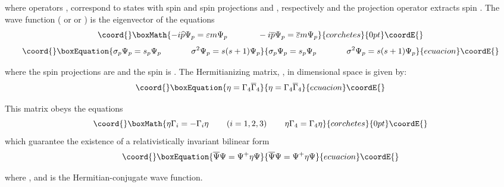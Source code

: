 \documentclass[a4paper,12pt]{article}
\begin{document}
where operators \coordHE{}, \coordHE{}
correspond to states with spin \coordHE{} and spin projections \coordHE{}
and \coordHE{}, respectively and the projection operator \coordHE{} extracts spin \coordHE{}.
The wave function \coordHE{} (\coordHE{} or \myHighlight{$\Psi _{\varepsilon
,\overline{\varepsilon }}$}\coordHE{} or \coordHE{}) is the eigenvector of the
equations
\[\coord{}\boxMath{
-i\widehat{p}\Psi _p=\varepsilon m\Psi
_p\hspace{0.5in}-i\overline{p}\Psi _p= \overline{\varepsilon
}m\Psi _p
}{corchetes}{0pt}\coordE{}\]
\begin{equation}\coord{}\boxEquation{
\sigma _p\Psi _p=s_p\Psi _p\hspace{0.5in}\sigma ^2\Psi _p=s(s+1)\Psi _p
\label{34}
}{
\sigma _p\Psi _p=s_p\Psi _p\hspace{0.5in}\sigma ^2\Psi _p=s(s+1)\Psi _p
}{ecuacion}\coordE{}\end{equation}

where the spin projections are \coordHE{} and the spin is \coordHE{}. The
Hermitianizing matrix, \myHighlight{$\eta $}\coordHE{}, in \coordHE{}dimensional space is given by:
\begin{equation}\coord{}\boxEquation{
\eta =\Gamma _4\overline{\Gamma }_4  \label{35}
}{
\eta =\Gamma _4\overline{\Gamma }_4  }{ecuacion}\coordE{}\end{equation}

This matrix obeys the equations
\[\coord{}\boxMath{
\eta \Gamma _i=-\Gamma _i\eta \hspace{0.3in}(i=1,2,3)\hspace{0.3in}\eta
\Gamma _4=\Gamma _4\eta
}{corchetes}{0pt}\coordE{}\]
which guarantee the existence of a relativistically invariant bilinear form
\begin{equation}\coord{}\boxEquation{
\overline{\Psi }\Psi =\Psi ^{+}\eta \Psi  \label{36}
}{
\overline{\Psi }\Psi =\Psi ^{+}\eta \Psi  }{ecuacion}\coordE{}\end{equation}

where \coordHE{}, and \myHighlight{$\Psi
^{+}$}\coordHE{} is the Hermitian-conjugate wave function.
\end{document}
